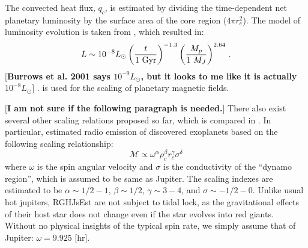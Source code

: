 \documentclass{emulateapj}
\def\memoYF#1{\color{red}$[${\bf #1}$]$ \color{black}}
\def\memoDS#1{\color{blue}$[${\bf #1}$]$ \color{black}}
\begin{document}
The convected heat flux, $q_c$, is estimated by dividing the time-dependent net planetary luminosity by the surface area of the core region ($4\pi r_c^2$). 
The model of luminosity evolution is taken from \citet{burrows_et_al2001} \citep[see also][]{marley2007}, which resulted in:
\begin{equation}
L \sim {10^{-8} L_\odot} \left( \frac{t}{1 \rm~Gyr} \right)^{-1.3} \left( \frac{M_p}{1~M_J} \right)^{2.64} \, .
\label{eq:burrowsLum}
\end{equation}
\memoYF{Burrows et al. 2001 says $10^{-9} L_\odot $, but it looks to me like it is actually $10^{-8} L_\odot $}. 
is used for the scaling of planetary magnetic fields. 

\memoYF{I am not sure if the following paragraph is needed.}
There also exist several other scaling relations proposed so far, which is compared in \citet{christensen2010}. 
In particular, \citet{griebmeier2004} estimated radio emission of discovered exoplanets based on the following scaling relationship: 
\begin{equation}
\mathcal{M} \propto  \omega ^{\alpha } \rho_c ^{\beta } r_c^{\gamma } \sigma ^{\delta }
\end{equation}
where $\omega $ is the spin angular velocity and $\sigma $ is the conductivity of the ``dynamo region'', which is assumed to be same as Jupiter. 
The scaling indexes are estimated to be $\alpha \sim 1/2-1$, $\beta \sim 1/2$, $\gamma \sim 3-4$, and $\sigma \sim -1/2-0$. 
%
Unlike usual hot jupiters, RGHJsEst are not subject to tidal lock, as the gravitational effects of their host star does not change even if the star evolves into red giants. Without no physical insights of the typical spin rate, we simply assume that of Jupiter: $\omega = 9.925$ [hr]. 

\end{document}
